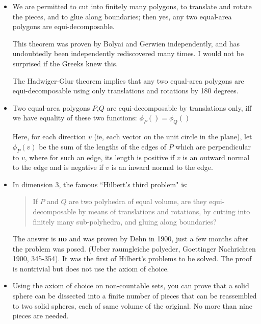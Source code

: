 \begin{itemize}
\item We are permitted to cut into finitely many polygons, to translate
        and rotate the pieces, and to glue along boundaries;
        then yes, any two equal-area polygons are equi-decomposable.

        This theorem was proven by Bolyai and Gerwien independently, and has
        undoubtedly been independently rediscovered many times.  I would not
        be surprised if the Greeks knew this.

        The Hadwiger-Glur theorem implies that any two equal-area polygons are
        equi-decomposable using only translations and rotations by 180
        degrees.

     \item \begin{teo}  Two equal-area polygons $P$,$Q$ are
        equi-decomposable by translations only, iff we have equality of these
        two functions:     $\phi_P() = \phi_Q()$
     \end{teo}
        Here, for each direction $v$ (ie, each vector on the unit circle in the
        plane), let $\phi_P(v)$ be the sum of the lengths of the edges of $P$
         which
        are perpendicular to $v$, where for such an edge, its length is positive
        if $v$ is an outward normal to the edge and is negative if $v$ is an
        inward normal to the edge.


     \item In dimension 3, the famous ``Hilbert's third problem" is:
\begin{quote}
       If $P$ and $Q$ are two polyhedra of equal volume, are they
        equi-decomposable by means of translations and rotations, by
        cutting into finitely many sub-polyhedra, and gluing along
        boundaries?
\end{quote}

        The answer is {\bf no} and was proven by Dehn in 1900, just a few months
        after the problem was posed. (Ueber raumgleiche polyeder, Goettinger
        Nachrichten 1900, 345-354). It was the first of Hilbert's problems
        to be solved. The proof is nontrivial but does not use the axiom
        of choice.

\Ref



     \item Using the axiom of choice on non-countable sets, you can prove
        that a solid sphere can be dissected into a finite number of
        pieces that can be reassembled to two solid spheres, each of
        same volume of the original. No more than nine pieces are needed.


\end{itemize}
